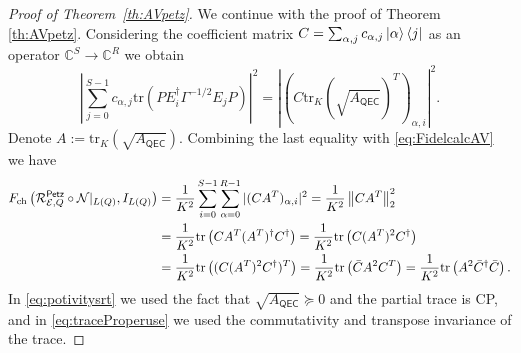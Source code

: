 \documentclass[10pt]{article}
\newcommand{\tr}{\mathrm{tr}}
\newcommand{\abs}[1]{\left|#1\right|}
\newcommand{\C}{\mathbb{C}}
\newcommand{\p}[1]{\left(#1\right)}
\newcommand{\norm}[1]{\left\|#1\right\|}
\newcommand{\s}[1]{\mathsf{#1}}
\begin{document}
\begin{proof}[Proof of Theorem~\ref{th:AVpetz}]
       
We continue with the proof of Theorem \ref{th:AVpetz}.     Considering the coefficient matrix $C=\sum_{\alpha,j}c_{\alpha,j}\ket{\alpha}\bra{j}$ as an operator $\C^S\to\C^R$ we obtain 
     \begin{equation*}
         \abs{\sum_{j=0}^{S-1}c_{\alpha,j}\tr\p{P E_i^\dag \Gamma^{-1/2} E_j P }}^2= \abs{\p{C\tr_K\p{\sqrt{ A_{\s{QEC}}}}^T}_{\alpha,i}}^2.
     \end{equation*}
Denote $A:=\tr_K(\sqrt{A_{\s{QEC}}})$. Combining the last equality with \eqref{eq:FidelcalcAV} we have
     \begin{align}
         F_{\mathrm{ch}}\p{\calR_{\calE,Q}^{\s{\s{Petz}}}\circ \calN|_{L(Q)},I_{L(Q)}}&\nonumber=\frac{1}{K^2}\sum_{i=0}^{S-1}\sum_{\alpha=0}^{R-1}|(CA^T)_{\alpha,i}|^2=\frac{1}{K^2}\norm{CA^T}_2^2\\
         &=\frac{1}{K^2}\tr\p{C A^T (A^T)^\dag C^\dag }=\frac{1}{K^2}\tr\p{C (A^T)^2 C^\dag }\label{eq:potivitysrt}\\
         &=\frac{1}{K^2}\tr\p{(C (A^T)^2 C^\dag)^T}=\frac{1}{K^2}\tr\p{\Bar{C} A^2 C^T}=\frac{1}{K^2}\tr\p{A^2\Bar{C}^\dag\Bar{C}}.\label{eq:traceProperuse}
     \end{align} 
     In \eqref{eq:potivitysrt} we used the fact that $\sqrt{A_{\s{QEC}}}\succeq 0$ and the partial trace is CP, and in \eqref{eq:traceProperuse} we used the commutativity and transpose invariance of the trace. 


\end{proof}
\end{document}
